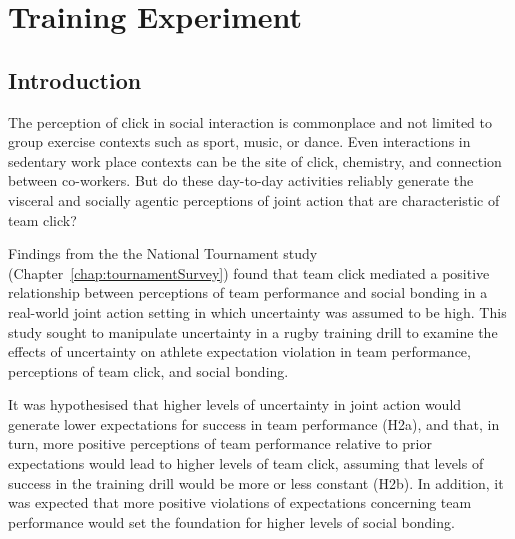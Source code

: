 

\begin{savequote}[8cm]

  \qauthor{}
\end{savequote}



\chapter{\label{chap:trainingExperiment}Training Experiment}



                                          \begin{CJK}{UTF8}{gbsn}







\minitoc


\section{Introduction}
The perception of click in social interaction is commonplace and not limited to group exercise contexts such as sport, music, or dance.  Even interactions in sedentary work place contexts can be the site of click, chemistry, and connection between co-workers.   But do these day-to-day activities reliably generate the visceral and socially agentic perceptions of joint action that are characteristic of team click?

Findings from the the National Tournament study (Chapter~\ref{chap:tournamentSurvey}) found that team click mediated a positive relationship between perceptions of team performance and social bonding in a real-world joint action setting in which uncertainty was assumed to be high.  This study sought to manipulate uncertainty in a rugby training drill to examine the effects of uncertainty on athlete expectation violation in team performance, perceptions of team click, and social bonding.

It was hypothesised that higher levels of uncertainty in joint action would generate lower expectations for success in team performance (H2a), and that, in turn, more positive perceptions of team performance relative to prior expectations would lead to higher levels of team click, assuming that levels of success in the training drill would be more or less constant (H2b).  In addition, it was expected that more positive violations of expectations concerning team performance would set the foundation for higher levels of social bonding.


\end{CJK}
